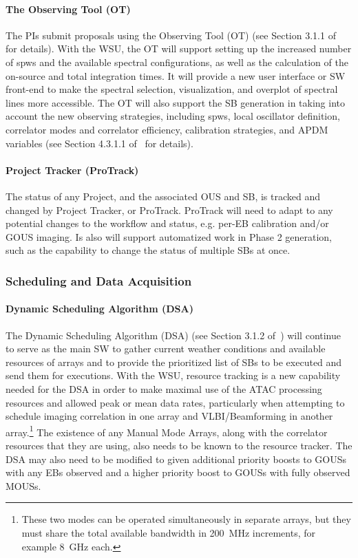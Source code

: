 \paragraph{The Observing Tool (OT)}\label{subsec:OT}
The PIs submit proposals using the Observing Tool (OT) (see Section 3.1.1 of~\cite{CSA-IA} for details). With the WSU, the OT will support setting up the increased number of spws and the available spectral configurations, as well as the calculation of the on-source and total integration times. It will provide a new user interface or SW front-end to make the spectral selection, visualization, and overplot of spectral lines more accessible. The OT will also support the SB generation in taking into account the new observing strategies, including spws, local oscillator definition, correlator modes and correlator efficiency, calibration strategies, and APDM variables (see Section 4.3.1.1 of~\cite{CSA-IA} for details).

\paragraph{Project Tracker (ProTrack)}
The status of any Project, and the associated OUS and SB, is tracked and changed by Project Tracker, or ProTrack. ProTrack will need to adapt to any potential changes to the workflow and status, e.g. per-EB calibration and/or GOUS imaging.
Is also will support automatized work in Phase 2 generation, such as the capability to change the status of multiple SBs at once.

\subsubsection{Scheduling and Data Acquisition}

\paragraph{Dynamic Scheduling Algorithm (DSA)}
The Dynamic Scheduling Algorithm (DSA) (see Section 3.1.2 of~\cite{CSA-IA}) will continue to serve as the main SW to gather current weather conditions and available resources of arrays and to provide the prioritized list of SBs to be executed and send them for executions. 
With the WSU, resource tracking is a new capability needed for the DSA in order to make maximal use of the ATAC processing resources and allowed peak or mean data rates, particularly when attempting to schedule imaging correlation in one array and VLBI/Beamforming in another array.\footnote{These two modes can be operated simultaneously in separate arrays, but they must share the total available bandwidth in 200~MHz increments, for example 8~GHz each.}
The existence of any Manual Mode Arrays, along with the correlator resources that they are using, also needs to be known to the resource tracker.  
The DSA may also need to be modified to given additional priority boosts to GOUSs with any EBs observed and a higher priority boost to GOUSs with fully observed MOUSs.

